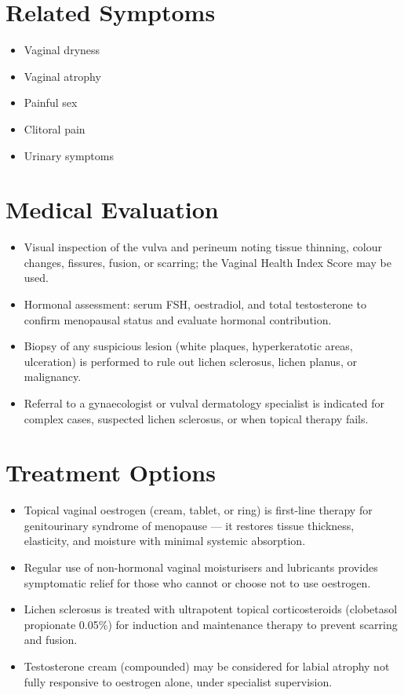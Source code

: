 \section*{Related Symptoms}
\begin{itemize}
  \item Vaginal dryness
  \item Vaginal atrophy
  \item Painful sex
  \item Clitoral pain
  \item Urinary symptoms
\end{itemize}


\section*{Medical Evaluation}
\begin{itemize}
  \item Visual inspection of the vulva and perineum noting tissue thinning, colour changes, fissures, fusion, or scarring; the Vaginal Health Index Score may be used.
  \item Hormonal assessment: serum FSH, oestradiol, and total testosterone to confirm menopausal status and evaluate hormonal contribution.
  \item Biopsy of any suspicious lesion (white plaques, hyperkeratotic areas, ulceration) is performed to rule out lichen sclerosus, lichen planus, or malignancy.
  \item Referral to a gynaecologist or vulval dermatology specialist is indicated for complex cases, suspected lichen sclerosus, or when topical therapy fails.
\end{itemize}

\section*{Treatment Options}
\begin{itemize}
  \item Topical vaginal oestrogen (cream, tablet, or ring) is first-line therapy for genitourinary syndrome of menopause — it restores tissue thickness, elasticity, and moisture with minimal systemic absorption.
  \item Regular use of non-hormonal vaginal moisturisers and lubricants provides symptomatic relief for those who cannot or choose not to use oestrogen.
  \item Lichen sclerosus is treated with ultrapotent topical corticosteroids (clobetasol propionate 0.05\%) for induction and maintenance therapy to prevent scarring and fusion.
  \item Testosterone cream (compounded) may be considered for labial atrophy not fully responsive to oestrogen alone, under specialist supervision.
\end{itemize}

